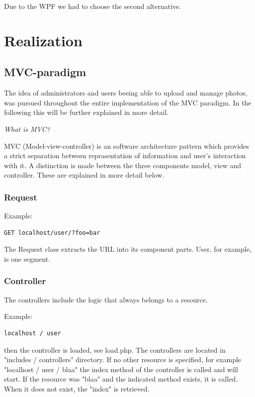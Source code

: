 \documentclass[a4paper,12pt,oneside]{article} %
\begin{document}
Due to the WPF we had to choose the second alternative. 


\section{Realization}


\subsection{MVC-paradigm}

The idea of administrators and users beeing able to upload and manage photos, 
was pursued throughout the entire implementation of the MVC paradigm.
In the following this will be further explained in more detail. 

\emph{What is MVC?}

MVC (Model-view-controller) is an software architecture pattern which provides a 
strict separation between reprasentation of information and user's interaction with it. 
A distinction is made between the three components model, view and controller. These
are explained in more detail below.


\subsubsection*{Request}

Example: 
\begin{lstlisting}
GET localhost/user/?foo=bar
\end{lstlisting}

The Request class extracts the URL into its component parts. User,
for example, is one segment.


\subsubsection*{Controller}

The controllers include the logic that always belongs to a resource. 

Example: 

\begin{lstlisting}
localhost / user
\end{lstlisting}
then the controller is loaded, see load.php. The controllers are
located in "includes / controllers" directory. If no other resource
is specified, for example "localhost / user / blaa"
the index method of the controller is called and will start. If the resource was
"blaa" and the indicated method exists, it is called. When it does not
exist, the "index" is retrieved.
\end{document}
